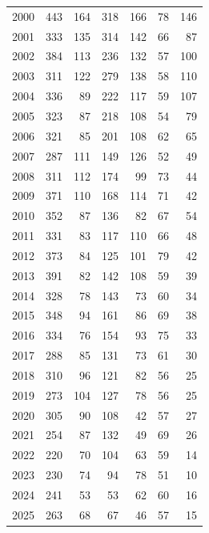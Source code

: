 \begin{apendicesenv}
\begin{landscape}
{\begin{longtable}{@{}rrrrrrr@{}}
2000 & 443 & 164 & 318 & 166 & 78 & 146 \\
2001 & 333 & 135 & 314 & 142 & 66 & 87 \\
2002 & 384 & 113 & 236 & 132 & 57 & 100 \\
2003 & 311 & 122 & 279 & 138 & 58 & 110 \\
2004 & 336 & 89 & 222 & 117 & 59 & 107 \\
2005 & 323 & 87 & 218 & 108 & 54 & 79 \\
2006 & 321 & 85 & 201 & 108 & 62 & 65 \\
2007 & 287 & 111 & 149 & 126 & 52 & 49 \\
2008 & 311 & 112 & 174 & 99 & 73 & 44 \\
2009 & 371 & 110 & 168 & 114 & 71 & 42 \\
2010 & 352 & 87 & 136 & 82 & 67 & 54 \\
2011 & 331 & 83 & 117 & 110 & 66 & 48 \\
2012 & 373 & 84 & 125 & 101 & 79 & 42 \\
2013 & 391 & 82 & 142 & 108 & 59 & 39 \\
2014 & 328 & 78 & 143 & 73 & 60 & 34 \\
2015 & 348 & 94 & 161 & 86 & 69 & 38 \\
2016 & 334 & 76 & 154 & 93 & 75 & 33 \\
2017 & 288 & 85 & 131 & 73 & 61 & 30 \\
2018 & 310 & 96 & 121 & 82 & 56 & 25 \\
2019 & 273 & 104 & 127 & 78 & 56 & 25 \\
2020 & 305 & 90 & 108 & 42 & 57 & 27 \\
2021 & 254 & 87 & 132 & 49 & 69 & 26 \\
2022 & 220 & 70 & 104 & 63 & 59 & 14 \\
2023 & 230 & 74 & 94 & 78 & 51 & 10 \\
2024 & 241 & 53 & 53 & 62 & 60 & 16 \\
2025 & 263 & 68 & 67 & 46 & 57 & 15 \\
\end{longtable}}
\vspace{-6pt}
\end{landscape}



\end{apendicesenv}
